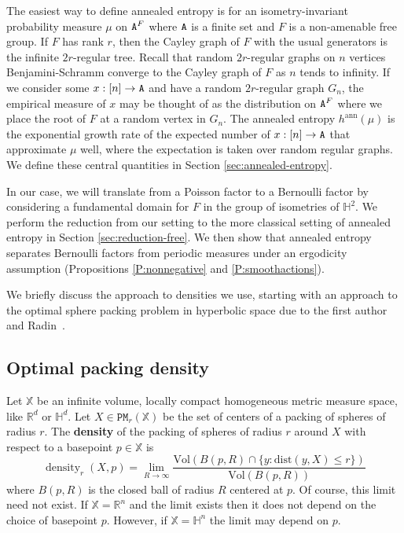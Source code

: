 \documentclass[11pt]{amsart}
\theoremstyle{definition}
\theoremstyle{remark}
\renewcommand{\H}{\mathbb{H}}
\newcommand{\R}{\mathbb{R}}
\newcommand{\bX}{\mathbb{X}}
\newcommand{\cP}{\mathtt{PM}}
\newcommand{\density}{\operatorname{density}}
\newcommand{\mes}{\mathrm{Vol}}
\newcommand{\dist}{\mathrm{dist}}
\begin{document}
The easiest way to define annealed entropy is for an isometry-invariant probability measure $\mu$ on ${\tt A}^F$ where ${\tt A}$ is a finite set and $F$ is a non-amenable free group.  If $F$ has rank $r$, then the Cayley graph of $F$ with the usual generators is the infinite $2r$-regular tree.  Recall that random $2r$-regular graphs on $n$ vertices Benjamini-Schramm converge to the Cayley graph of $F$ as $n$ tends to infinity.  If we consider some $x: [n] \to {\tt A}$ and have a random $2r$-regular graph $G_n$, the empirical measure of $x$ may be thought of as the distribution on ${\tt A}^F$ where we place the root of $F$ at a random vertex in $G_n$.  The annealed entropy $h^{\mathrm{ann}}(\mu)$ is the exponential growth rate of the expected number of $x:[n] \to {\tt A}$ that approximate $\mu$ well, where the expectation is taken over random regular graphs.  We define these central quantities in Section \ref{sec:annealed-entropy}.

In our case, we will translate from a Poisson factor to a Bernoulli factor by considering a fundamental domain for $F$ in the group of isometries of $\H^2$.  We perform the reduction from our setting to the more classical setting of annealed entropy in Section \ref{sec:reduction-free}.  We then show that annealed entropy separates Bernoulli factors from periodic measures under an ergodicity assumption (Propositions \ref{P:nonnegative} and \ref{P:smoothactions}).

We briefly discuss the approach to densities we use, starting with an approach to the optimal sphere packing problem in hyperbolic space due to the first author and Radin~\cite{bowen2002densest}.

\subsection{Optimal packing density} \label{sec:optimal-packing-density}

Let $\bX$ be an infinite volume, locally compact homogeneous metric measure space, like $\R^d$ or $\H^d$.  Let $X \in \cP_r(\bX)$ be the set of centers of a packing of spheres of radius $r$.  The {\bf density} of the packing of spheres of radius $r$ around $X$ with respect to a basepoint $p\in \bX$ is 
$$\density_r(X,p) = \lim_{R \to \infty} \frac{\mes(B(p,R) \cap  \{y: \dist(y,X) \le r    \})}{\mes(B(p,R))}$$
where $B(p,R)$ is the closed  ball of radius $R$ centered at $p$. Of course, this limit need not exist.  If $\bX=\R^n$ and the limit exists then it does not depend on the choice of basepoint $p$. However, if $\bX=\H^n$  the limit may depend on $p$. 
\end{document}
